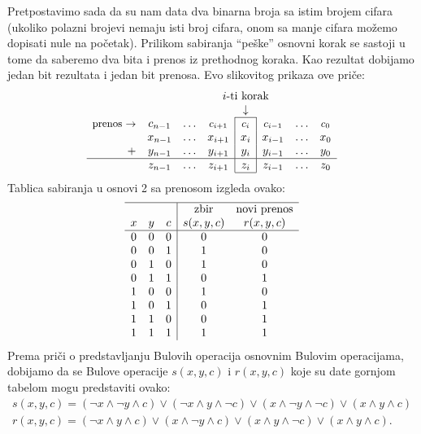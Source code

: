 Pretpostavimo sada da su nam data dva binarna broja sa istim brojem cifara
(ukoliko polazni brojevi nemaju isti broj cifara, onom sa manje cifara
mo\v zemo dopisati nule na po\v cetak). Prilikom sabiranja \enquote{pe\v ske}
osnovni korak se sastoji u tome da saberemo dva bita i prenos iz prethodnog
koraka. Kao rezultat dobijamo jedan bit rezultata i jedan bit prenosa.
Evo slikovitog prikaza ove pri\v ce:
{\def\ss#1{\mbox{\small$#1$}}%
$$
    \begin{array}{rccc|c|ccc}
        & & &\multicolumn{3}{c}{\mbox{$i$-ti korak}}& & \\
        & & &\multicolumn{1}{c}{ }&\multicolumn{1}{c}{\downarrow}& & &
            \\ \cline{5-5}
    \mbox{\small prenos $\rightarrow$}
        &c_{n-1}&\ldots&\ss{c_{i+1}}&\ss{c_i}&\ss{c_{i-1}}&\ldots&\ss{c_0}\\
        &x_{n-1}&\ldots&x_{i+1}&x_i&x_{i-1}&\ldots&x_0\\
      + &y_{n-1}&\ldots&y_{i+1}&y_i&y_{i-1}&\ldots&y_0\\
      \hline
        &z_{n-1}&\ldots&z_{i+1}&z_i&z_{i-1}&\ldots&z_0
            \\ \cline{5-5}
    \end{array}
$$
Tablica sabiranja u osnovi 2 sa prenosom izgleda ovako:
$$
    \begin{array}{ccc|cc} \hline
          &   &   & \mbox{zbir}       & \mbox{novi prenos} \\
        x & y & c & s(x, y, c) & r(x, y, c) \\
        \hline
        0 & 0 & 0 & 0 & 0\\
        0 & 0 & 1 & 1 & 0\\
        0 & 1 & 0 & 1 & 0\\
        0 & 1 & 1 & 0 & 1\\
        1 & 0 & 0 & 1 & 0\\
        1 & 0 & 1 & 0 & 1\\
        1 & 1 & 0 & 0 & 1\\
        1 & 1 & 1 & 1 & 1
    \end{array}
$$}%
Prema pri\v ci o predstavljanju Bulovih operacija osnovnim Bulovim
operacijama, dobijamo da se Bulove operacije $s(x, y, c)$ i
$r(x, y, c)$ koje su date gornjom tabelom mogu predstaviti ovako:
$$
    \begin{array}{l}
        s(x, y, c) = (\lnot x \land \lnot y \land c) \lor
            (\lnot x \land y \land \lnot c) \lor
            (x \land \lnot y \land \lnot c) \lor
            (x \land y \land c) \\
        r(x, y, c) = (\lnot x \land y \land c) \lor
            (x \land \lnot y \land c) \lor
            (x \land y \land \lnot c) \lor
            (x \land y \land c).
    \end{array}
$$

